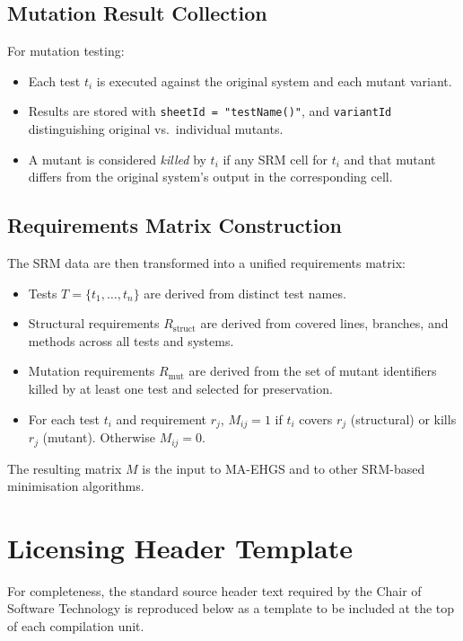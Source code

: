 \begin{appendices}
\subsection*{Mutation Result Collection}

For mutation testing:

\begin{itemize}
  \item Each test $t_i$ is executed against the original system and each mutant variant.
  \item Results are stored with \texttt{sheetId = "testName()"}, and \texttt{variantId} distinguishing original vs.\ individual mutants.
  \item A mutant is considered \emph{killed} by $t_i$ if any SRM cell for $t_i$ and that mutant differs from the original system's output in the corresponding cell.
\end{itemize}

\subsection*{Requirements Matrix Construction}

The SRM data are then transformed into a unified requirements matrix:

\begin{itemize}
  \item Tests $T = \{t_1,\dots,t_n\}$ are derived from distinct test names.
  \item Structural requirements $R_{\text{struct}}$ are derived from covered lines, branches, and methods across all tests and systems.
  \item Mutation requirements $R_{\text{mut}}$ are derived from the set of mutant identifiers killed by at least one test and selected for preservation.
  \item For each test $t_i$ and requirement $r_j$, $M_{ij}=1$ if $t_i$ covers $r_j$ (structural) or kills $r_j$ (mutant). Otherwise $M_{ij}=0$.
\end{itemize}

The resulting matrix $M$ is the input to MA-EHGS and to other SRM-based minimisation algorithms.

\clearpage

\section{Licensing Header Template}
\label{app:license}

For completeness, the standard source header text required by the Chair of Software Technology is reproduced below as a template to be included at the top of each compilation unit.


\end{appendices}
